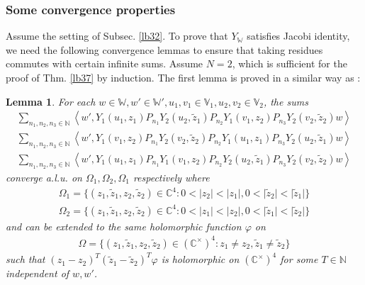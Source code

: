\documentclass[11pt,b5paper,notitlepage]{article}
\theoremstyle{definition}
\theoremstyle{plain}
\newtheorem{lm}[df]{Lemma}
\newcommand{\wtd}{\widetilde}
\newcommand{\Vbb}{\mathbb V}
\newcommand{\Wbb}{\mathbb W}
\newcommand{\Cbb}{\mathbb C}
\newcommand{\Nbb}{\mathbb N}
\newcommand{\<}{\left\langle}
\renewcommand{\>}{\right\rangle}
\numberwithin{equation}{section}
\begin{document}
\subsubsection{Some convergence properties}






Assume the setting of Subsec. \ref{lb32}. To prove that $Y_\Wbb$ satisfies Jacobi identity, we need the following convergence lemmas to ensure that taking residues commutes with certain infinite sums. Assume $N=2$, which is sufficient for the proof of Thm. \ref{lb37} by induction. The first lemma is proved in a similar way as \cite[Prop. 3.5.1]{FHL93}:


\begin{lm}\label{lb29}
         For each $w\in \Wbb,w'\in \Wbb',u_1,v_1\in \Vbb_1,u_2,v_2\in \Vbb_2$, the sums
\begin{subequations}
\begin{gather}
\sum_{n_1,n_2,n_3\in\Nbb} \<w',Y_1(u_1,z_1)P_{n_1}Y_2(u_2, \wtd z_1)P_{n_2}Y_1(v_1,z_2)P_{n_3}Y_2(v_2,\wtd z_2)w\>  \label{locality1}\\
\sum_{n_1,n_2,n_3\in\Nbb} \<w',Y_1(v_1,z_2)P_{n_1}Y_2(v_2, \wtd z_2)P_{n_2}Y_1(u_1,z_1)P_{n_3}Y_2(u_2,\wtd z_1)w\>  \label{locality2}\\
\sum_{n_1,n_2,n_3\in\Nbb} \<w',Y_1(u_1,z_1)P_{n_1}Y_1(v_1,z_2)P_{n_2}Y_2(u_2, \wtd z_1)P_{n_3}Y_2(v_2,\wtd z_2)w\>  \label{eq104}
\end{gather}
\end{subequations}
converge a.l.u. on $\Omega_1,\Omega_2,\Omega_1$ respectively where
\begin{subequations}
\begin{gather}
\Omega_1=\{(z_1,\wtd z_1,z_2,\wtd z_2)\in \Cbb^4:0<\vert z_2\vert <\vert z_1\vert,0<\vert \wtd z_2\vert <\vert \wtd z_1\vert\}\\
\Omega_2=\{(z_1,\wtd z_1,z_2,\wtd z_2)\in \Cbb^4:0<\vert z_1\vert <\vert z_2\vert,0<\vert \wtd z_1\vert <\vert \wtd z_2\vert\}
\end{gather}
\end{subequations}
and can be extended to the same holomorphic function $\varphi$ on 
\begin{gather}
\Omega=\{(z_1,\wtd z_1,z_2,\wtd z_2)\in (\Cbb^\times)^4:z_1\ne z_2,\wtd z_1\ne \wtd z_2\}  \label{eq91}
\end{gather}
such that $(z_1-z_2)^T (\wtd z_1-\wtd z_2)^T \varphi$ is holomorphic on $(\Cbb^\times)^4$ for some $T\in \Nbb$ independent of $w,w'$.
\end{lm}
\end{document}
